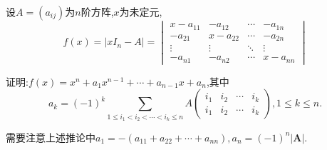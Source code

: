 \documentclass[lang=cn,newtx,10pt,scheme=chinese]{elegantbook}
\begin{document}
\begin{corollary}
    设\(A=(a_{ij})\)为\(n\)阶方阵,\(x\)为未定元,
\[
f(x)=\vert xI_n - A\vert = 
\begin{vmatrix}
x - a_{11} & -a_{12} & \cdots & -a_{1n} \\
-a_{21} & x - a_{22} & \cdots & -a_{2n} \\
\vdots & \vdots & \ddots & \vdots \\
-a_{n1} & -a_{n2} & \cdots & x - a_{nn}
\end{vmatrix}
\]

证明:\(f(x)=x^n + a_1x^{n - 1}+ \cdots + a_{n - 1}x + a_n\),其中
\[
a_k=(-1)^k \sum_{1\leq i_1 < i_2<\cdots <i_k\leq n} A
\begin{pmatrix}
i_1 & i_2 & \cdots & i_k \\
i_1 & i_2 & \cdots & i_k
\end{pmatrix}, 1\leq k\leq n.
\]
\end{corollary}
\begin{note}
    需要注意上述推论中$a_1=-(a_{11}+a_{22}+\cdots+a_{nn}),a_n=\left( -1 \right) ^n\left| \boldsymbol{A} \right|.$
\end{note}
\end{document}
